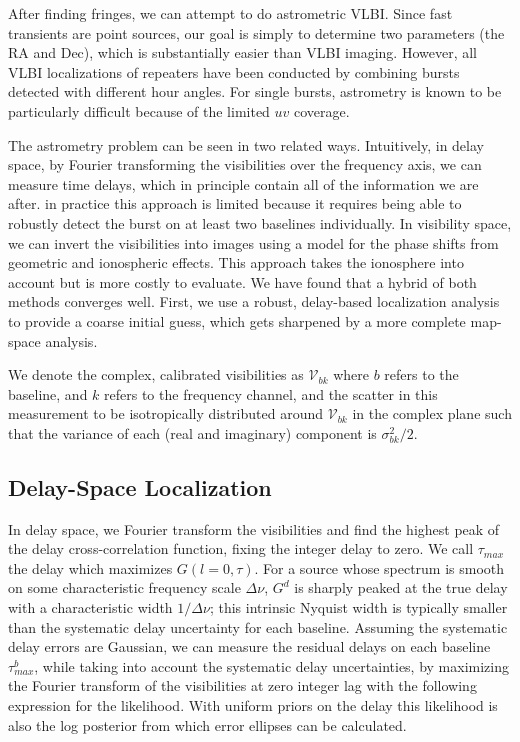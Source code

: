 After finding fringes, we can attempt to do astrometric VLBI. Since fast transients are point sources, our goal is simply to determine two parameters (the RA and Dec), which is substantially easier than VLBI imaging. However, all VLBI localizations of repeaters have been conducted by combining bursts detected with different hour angles. For single bursts, astrometry is known to be particularly difficult because of the limited $uv$ coverage. 

The astrometry problem can be seen in two related ways. Intuitively, in delay space, by Fourier transforming the visibilities over the frequency axis, we can measure time delays, which in principle contain all of the information we are after. in practice this approach is limited because it requires being able to robustly detect the burst on at least two baselines individually. In visibility space, we can invert the visibilities into images using a model for the phase shifts from geometric and ionospheric effects. This approach takes the
ionosphere into account but is more costly to evaluate. We have found that a hybrid of both methods converges well. First, we use a robust, delay-based localization analysis to provide a coarse initial guess, which gets sharpened by a more complete map-space analysis. 

We denote the complex, calibrated visibilities as $\mathcal{V}_{bk}$ where $b$ refers to the baseline, and $k$ refers to the frequency channel, and the scatter in this measurement to be isotropically distributed around $\mathcal{V}_{bk}$ in the complex plane such that the variance of each (real and imaginary) component is $\sigma^2_{bk}/2$.

\subsection{Delay-Space Localization}\label{sec:coarse_loc}
In delay space, we Fourier transform the visibilities and find the highest peak of the delay cross-correlation function, fixing the integer delay to zero. We call $\tau_{max}$ the delay which maximizes $G(l=0,\tau)$. For a source whose spectrum is smooth on some characteristic frequency scale $\Delta \nu$, $G^d$ is sharply peaked at the true delay with a characteristic width $1/\Delta \nu$; this intrinsic Nyquist width is typically smaller than the systematic delay uncertainty for each baseline. Assuming the systematic delay errors are Gaussian, we can measure the residual delays on each baseline $\tau_{max}^b$, while taking into account the systematic delay uncertainties, by maximizing the Fourier transform of the visibilities at zero integer lag with the following expression for the likelihood. With uniform priors on the delay this likelihood is also the log posterior from which error ellipses can be calculated.

